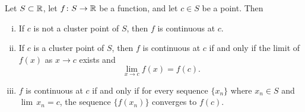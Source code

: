 \enlargethispage{\baselineskip}
\begin{prop} \label{contbasic:prop}
Let $S \subset {\mathbb{R}}$, let $f \colon S \to {\mathbb{R}}$ be a function, and let $c \in S$
be a point.
Then
\begin{enumerate}[(i)]
\item If $c$ is not a cluster point of $S$, then $f$ is continuous at $c$.
\item If $c$ is a cluster point of $S$, then $f$ is continuous at $c$
if and only if the limit of $f(x)$ as $x \to c$ exists and
\begin{equation*}
\lim_{x\to c} f(x) = f(c) .
\end{equation*}
\item $f$ is continuous at $c$ if and only if for every sequence $\{ x_n \}$
where $x_n \in S$ and $\lim\, x_n = c$, the sequence $\{ f(x_n) \}$ converges
to $f(c)$.
\end{enumerate}
\end{prop}

